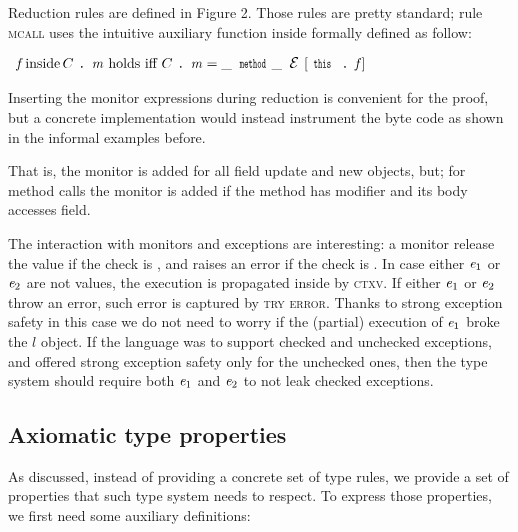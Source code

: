 Reduction rules are defined in Figure 2.
Those rules are pretty standard;
rule \textsc{mcall}
uses the intuitive auxiliary function $\text{inside}$
formally defined as follow:

\noindent $\begin{array}{l}
\f\, \text{inside}\, C\singleDot\m\text{ holds iff }
C\singleDot\m=\_\,\Kw{method}\_\,\ctx[\Kw{this}\singleDot\f]
\end{array}$

\noindent Inserting the monitor expressions during reduction is convenient for the proof,
but a concrete implementation would
instead instrument the byte code as shown in the informal examples before.

That is, the monitor is added for all field update and new objects, but;
for method calls the monitor is added if the method has \Q@mut@ modifier and its body accesses \Q@capsule@ field.

The interaction with monitors and exceptions are interesting:
a monitor release the value if the check is \Q@true@, and raises an error if the 
check is \Q@false@.
In case either ${\mathit{e}}_1$ or ${\mathit{e}}_2$ are not values, the execution is propagated inside
by \textsc{ctxv}.
If either ${\mathit{e}}_1$ or ${\mathit{e}}_2$ throw an error, such error is captured by 
\textsc{try error}.
Thanks to strong exception safety
in this case we do not need to worry
if the (partial) execution of ${\mathit{e}}_1$ broke the $l$ object.
If the language was to support checked and unchecked exceptions, and offered 
strong exception safety only for the unchecked ones, then 
the type system should require both ${\mathit{e}}_1$ and ${\mathit{e}}_2$ to not leak 
checked exceptions.








\subsection{Axiomatic type properties}

As discussed, instead of providing a concrete set of type rules, we provide a set of properties
that such type system needs to respect.
To express those properties, we first need some auxiliary definitions:


